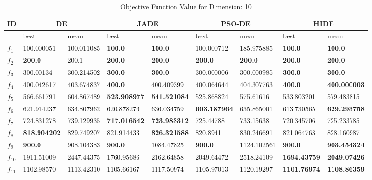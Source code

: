 \begin{table*}[t!]
\centering
\caption{Objective Function Value for Dimension: 10}
 \begin{tabular}{|p{0.8cm}|p{1.6cm}|p{1.6cm}|p{1.6cm}|p{1.6cm}|p{1.6cm}|p{1.6cm}|p{1.6cm}|p{1.6cm}|} 
 \hline
 ID & \multicolumn{2}{c|}{DE} & \multicolumn{2}{c|}{JADE} & \multicolumn{2}{c|}{PSO-DE} & \multicolumn{2}{c|}{HIDE} \\
 \hline
    & best & mean & best & mean & best & mean & best & mean \\ [0.5ex] 
 \hline
$f_1$  & 100.000051 & 100.011085 & \textbf{100.0} & \textbf{100.0} & 100.000712 & 185.975885 & \textbf{100.0} & \textbf{100.0} \\ 
$f_2$  & \textbf{200.0} & 200.1 & \textbf{200.0} & \textbf{200.0} & \textbf{200.0} & \textbf{200.0} & \textbf{200.0} & \textbf{200.0} \\ 
$f_3$  & 300.00134 & 300.214502 & \textbf{300.0} & \textbf{300.0} & 300.000006 & 300.000985 & \textbf{300.0} & \textbf{300.0} \\ 
$f_4$  & 400.042617 & 403.674837 & \textbf{400.0} & 400.409399 & 400.064644 & 404.307763 & \textbf{400.0} & \textbf{400.000003} \\ 
$f_5$  & 566.661791 & 604.867489 & \textbf{523.908977} & \textbf{541.521084} & 525.868824 & 575.61616 & 533.803201 & 579.483815 \\ 
$f_6$  & 621.914237 & 634.807962 & 620.878276 & 636.034759 & \textbf{603.187964} & 635.865001 & 613.730565 & \textbf{629.293758} \\ 
$f_7$  & 724.831278 & 739.129935 & \textbf{717.016542} & \textbf{723.983312} & 725.44788 & 733.15638 & 720.345706 & 725.233785 \\ 
$f_8$  & \textbf{818.904202} & 829.749207 & 821.914433 & \textbf{826.321588} & 820.8941 & 830.246691 & 821.064763 & 828.160987 \\ 
$f_9$  & \textbf{900.0} & 908.104383 & \textbf{900.0} & 1084.47825 & \textbf{900.0} & 1124.102561 & \textbf{900.0} & \textbf{903.454324} \\ 
$f_{10}$  & 1911.51009 & 2447.44375 & 1760.95686 & 2162.64858 & 2049.64472 & 2518.24109 & \textbf{1694.43759} & \textbf{2049.07426} \\ 
$f_{11}$  & 1102.98570 & 1113.42310 & 1105.66167 & 1117.50974 & 1105.97013 & 1120.19297 & \textbf{1101.76974} & \textbf{1108.86359} \\ 

\end{tabular}
\end{table*}
